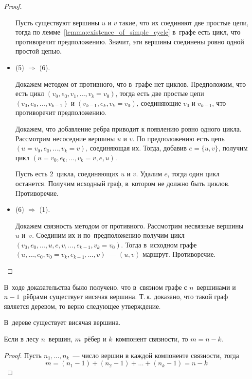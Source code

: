 \begin{proof}
\begin{itemize}
	Пусть существуют вершины $u$ и $v$ такие, что их соединяют две простые цепи, тогда по лемме~\ref{lemma:existence_of_simple_cycle} в~графе есть цикл, что противоречит предположению.
	Значит, эти вершины соединены ровно одной простой цепью.
	
	\item (5) $\Rightarrow$ (6).
	
	Докажем методом от противного, что в~графе нет циклов.
	Предположим, что есть цикл $(v_0, e_0, v_1, \ldots, v_k = v_0)$, тогда есть две простые цепи $(v_0, e_0, \ldots, v_{k-1})$ и $(v_{k-1}, e_k, v_k = v_0)$, соединяющие $v_0$ и $v_{k-1}$, что противоречит предположению.
	
	Докажем, что добавление ребра приводит к появлению ровно одного цикла.
	Рассмотрим несоседние вершины $u$ и $v$.
	По предположению есть цепь $(u = v_0, e_0, \ldots, v_k = v)$, соединяющая их.
	Тогда, добавив $e = \{ u, v \}$, получим цикл $(u = v_0, e_0, \ldots, v_k = v, e, u)$.
	
	Пусть есть $2$~цикла, соединяющих $u$ и $v$.
	Удалим $e$, тогда один цикл останется.
	Получим исходный граф, в~котором не должно быть циклов.
	Противоречие.
	
	\item (6) $\Rightarrow$ (1).
	
	Докажем связность методом от противного.
	Рассмотрим несвязные вершины $u$ и~$v$.
	Соединим их и по~предположению получим цикл $(v_0, e_0, \ldots, u, e, v, \ldots, e_{k-1}, v_k = v_0)$.
	Тогда в~исходном графе $(u, \ldots, e_0, v_0 = v_k, \allowbreak e_{k-1}, \ldots, v)$~--- $(u, v)$-маршрут.
	Противоречие.
\end{itemize}
\end{proof}

В~ходе доказательства было получено, что в~связном графе с $n$~вершинами и $n - 1$~рёбрами существует висячая вершина.
Т.\,к. доказано, что такой граф является деревом, то верно следующее утверждение.
\begin{statement}
В~дереве существует висячая вершина.
\end{statement}

\begin{statement}
Если в лесу $n$~вершин, $m$~рёбер и $k$~компонент связности, то $m = n - k$.
\end{statement}
\begin{proof}
Пусть $n_1, \ldots, n_k$~--- число вершин в каждой компоненте связности, тогда
\begin{equation*}
m = (n_1 - 1) + (n_2 - 1) + \ldots + (n_k - 1) = n - k
\end{equation*}
\end{proof}